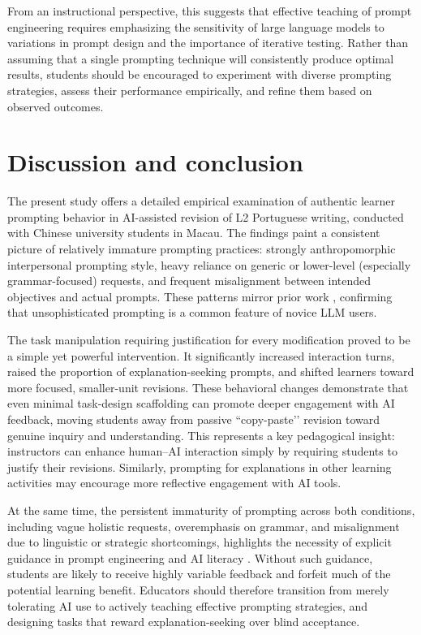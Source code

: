 \documentclass[english]{textolivre}
\begin{document}
From an instructional perspective, this suggests that effective teaching of prompt engineering requires emphasizing the sensitivity of large language models to variations in prompt design and the importance of iterative testing. Rather than assuming that a single prompting technique will consistently produce optimal results, students should be encouraged to experiment with diverse prompting strategies, assess their performance empirically, and refine them based on observed outcomes.

\section{Discussion and conclusion}\label{sec5}

The present study offers a detailed empirical examination of authentic learner prompting behavior in AI-assisted revision of L2 Portuguese writing, conducted with Chinese university students in Macau. The findings paint a consistent picture of relatively immature prompting practices: strongly anthropomorphic interpersonal prompting style, heavy reliance on generic or lower-level (especially grammar-focused) requests, and frequent misalignment between intended objectives and actual prompts. These patterns mirror prior work \cite{hwang2024exploring,KNOTH2024100225,zamfirescu2023johnny}, confirming that unsophisticated prompting is a common feature of novice LLM users.

The task manipulation requiring justification for every modification proved to be a simple yet powerful intervention. It significantly increased interaction turns, raised the proportion of explanation-seeking prompts, and shifted learners toward more focused, smaller-unit revisions. These behavioral changes demonstrate that even minimal task-design scaffolding can promote deeper engagement with AI feedback, moving students away from passive ``copy-paste’’ revision toward genuine inquiry and understanding. This represents a key pedagogical insight: instructors can enhance human–AI interaction simply by requiring students to justify their revisions. Similarly, prompting for explanations in other learning activities may encourage more reflective engagement with AI tools.

At the same time, the persistent immaturity of prompting across both conditions, including vague holistic requests, overemphasis on grammar, and misalignment due to linguistic or strategic shortcomings, highlights the necessity of explicit guidance in prompt engineering and AI literacy \cite{hwang2023prompt}. Without such guidance, students are likely to receive highly variable feedback and forfeit much of the potential learning benefit. Educators should therefore transition from merely tolerating AI use to actively teaching effective prompting strategies, and designing tasks that reward explanation-seeking over blind acceptance.
\end{document}
